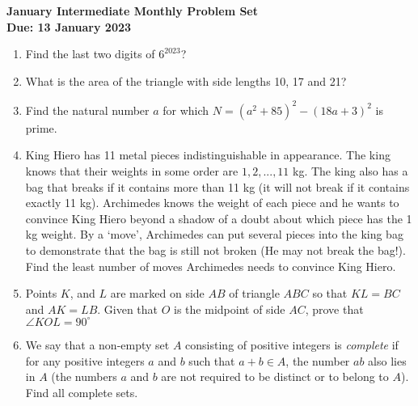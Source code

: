\documentclass{article}
\begin{document}
\thispagestyle{empty}

\begin{center}
  \textbf{\Large January Intermediate Monthly Problem Set}
  \\ \vspace{1em}
  \textbf{\large Due: 13 January 2023}
\end{center}

\bigskip \bigskip

\begin{enumerate}[itemsep=\fill]

\item %
Find the last two digits of $6^{2023}$?
 
\item %
What is the area of the triangle with side lengths 10, 17 and 21?


\item %
Find the natural number $a$ for which $N = (a^{2} + 85)^{2} - (18a+3)^{2}$ is prime.


\item %
King Hiero has 11 metal pieces indistinguishable in appearance. The king knows that their weights in some order are $1,2,...,11$ kg. The king also has a bag that breaks if it contains more than 11 kg (it will not break if it contains exactly 11 kg). Archimedes knows the weight of each piece and he wants to convince King Hiero beyond a shadow of a doubt about which piece has the 1 kg weight. By a `move', Archimedes can put several pieces into the king bag to demonstrate that the bag is still not broken (He may not break the bag!). Find the least number of moves Archimedes needs to convince King Hiero. 


\item %
Points $K$, and $L$ are marked on side $AB$ of triangle $ABC$ so that $KL=BC$ and $AK=LB$. Given that $O$ is the midpoint of side $AC$, prove that $\angle{KOL} = 90^{\circ}$


\item %
We say that a non-empty set $A$ consisting of positive integers is \textit{complete} if for any positive integers $a$ and $b$ such that $a+b\in A$, the number $ab$ also lies in $A$ (the numbers $a$ and $b$ are not required to be distinct or to belong to $A$). Find all complete sets.

\end{enumerate}
\end{document}
